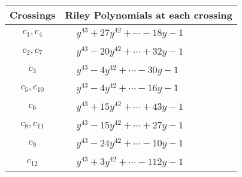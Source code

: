 \documentclass[1p]{elsarticle_modified}
\theoremstyle{definition}
\begin{document}
\begin{tabular}{m{50pt}|m{274pt}}
Crossings & \hspace{64pt}Riley Polynomials at each crossing \\
\hline $$\begin{aligned}c_{1},c_{4}\end{aligned}$$&$\begin{aligned}
&y^{43}+27 y^{42}+\cdots-18 y-1
\end{aligned}$\\
\hline $$\begin{aligned}c_{2},c_{7}\end{aligned}$$&$\begin{aligned}
&y^{43}-20 y^{42}+\cdots+32 y-1
\end{aligned}$\\
\hline $$\begin{aligned}c_{3}\end{aligned}$$&$\begin{aligned}
&y^{43}-4 y^{42}+\cdots-30 y-1
\end{aligned}$\\
\hline $$\begin{aligned}c_{5},c_{10}\end{aligned}$$&$\begin{aligned}
&y^{43}-4 y^{42}+\cdots-16 y-1
\end{aligned}$\\
\hline $$\begin{aligned}c_{6}\end{aligned}$$&$\begin{aligned}
&y^{43}+15 y^{42}+\cdots+43 y-1
\end{aligned}$\\
\hline $$\begin{aligned}c_{8},c_{11}\end{aligned}$$&$\begin{aligned}
&y^{43}-15 y^{42}+\cdots+27 y-1
\end{aligned}$\\
\hline $$\begin{aligned}c_{9}\end{aligned}$$&$\begin{aligned}
&y^{43}-24 y^{42}+\cdots-10 y-1
\end{aligned}$\\
\hline $$\begin{aligned}c_{12}\end{aligned}$$&$\begin{aligned}
&y^{43}+3 y^{42}+\cdots-112 y-1
\end{aligned}$\\
\hline
\end{tabular}\\~\\
\end{document}

